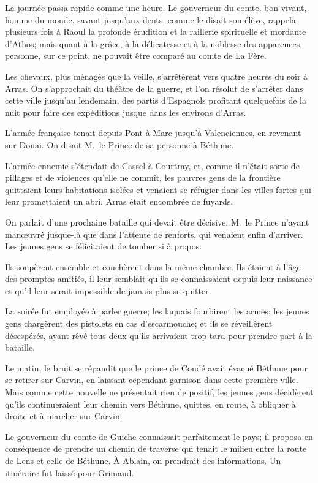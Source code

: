La journée passa rapide comme une heure. Le gouverneur du comte, bon vivant, homme du monde, savant jusqu'aux dents, comme le disait son élève, rappela plusieurs fois à Raoul la profonde érudition et la raillerie spirituelle et mordante d'Athos; mais quant à la grâce, à la délicatesse et à la noblesse des apparences, personne, sur ce point, ne pouvait être comparé au comte de La Fère.

Les chevaux, plus ménagés que la veille, s'arrêtèrent vers quatre heures du soir à Arras. On s'approchait du théâtre de la guerre, et l'on résolut de s'arrêter dans cette ville jusqu'au lendemain, des partis d'Espagnols profitant quelquefois de la nuit pour faire des expéditions jusque dans les environs d'Arras.

L'armée française tenait depuis Pont-à-Marc jusqu'à Valenciennes, en revenant sur Douai. On disait M.~le Prince de sa personne à Béthune.

L'armée ennemie s'étendait de Cassel à Courtray, et, comme il n'était sorte de pillages et de violences qu'elle ne commît, les pauvres gens de la frontière quittaient leurs habitations isolées et venaient se réfugier dans les villes fortes qui leur promettaient un abri. Arras était encombrée de fuyards.

On parlait d'une prochaine bataille qui devait être décisive, M.~le Prince n'ayant manœuvré jusque-là que dans l'attente de renforts, qui venaient enfin d'arriver. Les jeunes gens se félicitaient de tomber si à propos.

Ils soupèrent ensemble et couchèrent dans la même chambre. Ils étaient à l'âge des promptes amitiés, il leur semblait qu'ils se connaissaient depuis leur naissance et qu'il leur serait impossible de jamais plus se quitter.

La soirée fut employée à parler guerre; les laquais fourbirent les armes; les jeunes gens chargèrent des pistolets en cas d'escarmouche; et ils se réveillèrent désespérés, ayant rêvé tous deux qu'ils arrivaient trop tard pour prendre part à la bataille.

Le matin, le bruit se répandit que le prince de Condé avait évacué Béthune pour se retirer sur Carvin, en laissant cependant garnison dans cette première ville. Mais comme cette nouvelle ne présentait rien de positif, les jeunes gens décidèrent qu'ils continueraient leur chemin vers Béthune, quittes, en route, à obliquer à droite et à marcher sur Carvin.

Le gouverneur du comte de Guiche connaissait parfaitement le pays; il proposa en conséquence de prendre un chemin de traverse qui tenait le milieu entre la route de Lens et celle de Béthune. À Ablain, on prendrait des informations. Un itinéraire fut laissé pour Grimaud.

